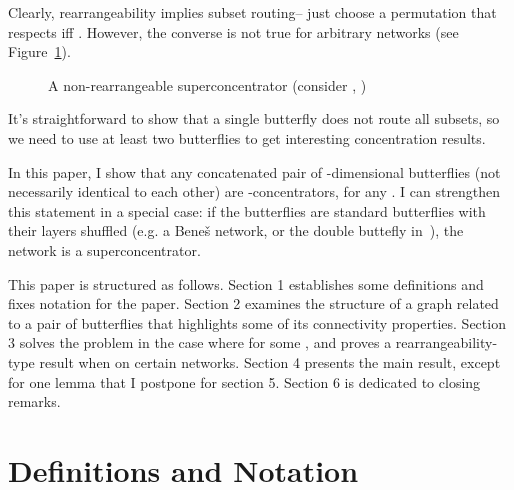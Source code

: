 \documentclass[12pt]{article}
\begin{document}
Clearly, rearrangeability implies subset routing-- just choose a permutation
that respects  iff .  However, the converse is not true
for arbitrary networks (see Figure~\ref{subset counterexample}).
\begin{figure}[ht]
\centerline{ \hspace{.2in}  }
\caption{A non-rearrangeable superconcentrator (consider 
, ) }
\label{subset counterexample}
\end{figure}
It's straightforward to show that a single butterfly does not route all 
subsets, so we need to use at least two butterflies to get interesting 
concentration results.

In this paper, I show that any concatenated pair of -dimensional 
butterflies 
(not necessarily identical to each other) are -concentrators, 
for any .  I can strengthen this statement in 
a special case:  if the butterflies
are standard butterflies with their layers shuffled (e.g. a Bene\v{s} 
network, or the double buttefly in~\cite{Cam}), the network
is a superconcentrator.

	This paper is structured as follows.  Section 1 establishes some 
definitions and fixes notation for the paper.  Section 2 examines the 
structure of a graph related to a pair of butterflies that highlights
some of its connectivity properties.  Section 3 solves the problem
in the case where  for some , and proves a 
rearrangeability-type result when 
on certain networks.
Section 4 presents the main result, except for one lemma 
that I postpone for section 5.  Section 6 is dedicated to closing remarks.

\section{Definitions and Notation}
\end{document}
